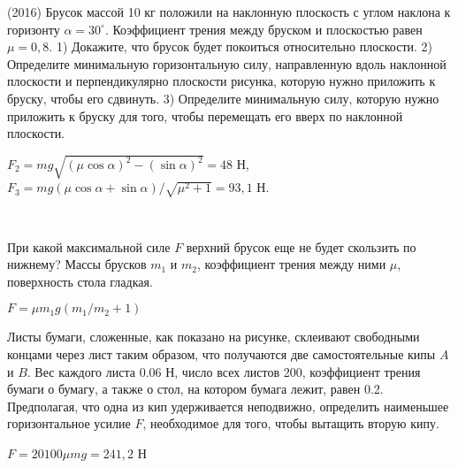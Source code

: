 \begin{ex}
(2016) Брусок массой 10 кг положили на наклонную плоскость с углом наклона к горизонту $\alpha = 30^{\circ}$. Коэффициент трения между бруском и плоскостью равен $\mu = 0,8$. 1) Докажите, что брусок будет покоиться относительно плоскости. 2) Определите минимальную горизонтальную силу, направленную вдоль наклонной плоскости и перпендикулярно плоскости рисунка, которую нужно приложить к бруску, чтобы его сдвинуть. 3) Определите минимальную силу‚ которую нужно приложить к бруску для того, чтобы перемещать его вверх по наклонной плоскости.
\begin{center}

\end{center}
\begin{ans}
$F_2 = mg \sqrt{(\mu \cos \alpha)^2 - (\sin \alpha)^2} = 48$ Н, $F_3 = mg(\mu \cos \alpha + \sin \alpha)/\sqrt{\mu^2 + 1} = 93,1$ Н. 
\end{ans}
\end{ex}

\begin{samepage}
\begin{ex}
\hspace{0pt} \\
\begin{minipage}{.65\textwidth}
При какой максимальной силе $F$ верхний брусок еще не будет скользить по нижнему? Массы брусков $m_1$ и $m_2$, коэффициент трения между ними $\mu$, поверхность стола гладкая.
\end{minipage}
\begin{minipage}{.35\textwidth}
\centering

\end{minipage}
\begin{ans}
$F = \mu m_1 g \left(m_1/m_2 + 1 \right)$
\end{ans}
\end{ex}
\end{samepage}

\begin{ex}
Листы бумаги, сложенные, как показано на рисунке, склеивают свободными концами через лист таким образом, что получаются две самостоятельные кипы $A$ и $B$. Вес каждого листа 0.06 Н, число всех листов 200, коэффициент трения бумаги о бумагу, а также о стол, на котором бумага лежит, равен 0.2. Предполагая, что одна из кип удерживается неподвижно, определить наименьшее горизонтальное усилие $F$, необходимое для того, чтобы вытащить вторую кипу.
\begin{center}

\end{center}
\begin{ans}
$F = 20100 \mu mg = 241,2$ Н
\end{ans}
\end{ex}

